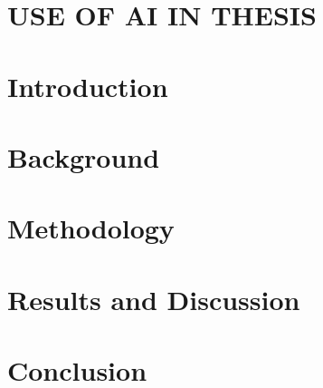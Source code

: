 \documentclass[english, ieee]{tauthesis}
\begin{document}
\clearpage
\chapter*{USE OF AI IN THESIS}
 
\clearpage



\tableofcontents







\mainmatter

\chapter{Introduction}
\label{ch:introduction}


\chapter{Background}
\label{ch: background}


\chapter{Methodology}
\label{ch:methodology}


\chapter{Results and Discussion}
\label{ch:results}


\chapter{Conclusion}
\label{ch:conclusion}

\end{document}
